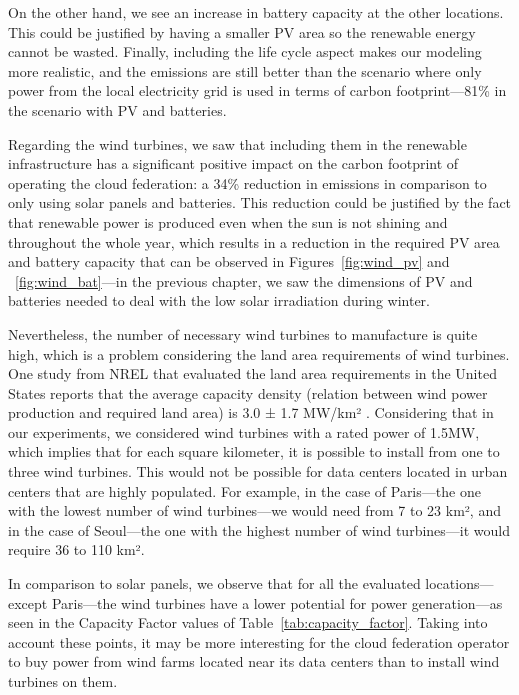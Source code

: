 On the other hand, we see an increase in battery capacity at the other locations. This could be justified by having a smaller PV area so the renewable energy cannot be wasted. Finally, including the life cycle aspect makes our modeling more realistic, and the emissions are still better than the scenario where only power from the local electricity grid is used in terms of carbon footprint---81\% in the scenario with PV and batteries.  


Regarding the wind turbines, we saw that including them in the renewable infrastructure has a significant positive impact on the carbon footprint of operating the cloud federation: a 34\% reduction in  emissions in comparison to only using solar panels and batteries. This reduction could be justified by the fact that renewable power is produced even when the sun is not shining and throughout the whole year, which results in a reduction in the required PV area and battery capacity that can be observed in Figures~\ref{fig:wind_pv} and ~\ref{fig:wind_bat}---in the previous chapter, we saw the dimensions of PV and batteries needed to deal with the low solar irradiation during winter.

Nevertheless, the number of necessary wind turbines to manufacture is quite high, which is a problem considering the land area requirements of wind turbines. One study from NREL that evaluated the land area requirements in the United States reports that the average capacity density (relation between wind power production and required land area) is 3.0 ± 1.7 MW/km² \cite{wtlanduse_2009}. Considering that in our experiments, we considered wind turbines with a rated power of 1.5MW, which implies that for each square kilometer, it is possible to install from one to three wind turbines. This would not be possible for data centers located in urban centers that are highly populated. For example, in the case of Paris---the one with the lowest number of wind turbines---we would need from 7 to 23 km², and in the case of Seoul---the one with the highest number of wind turbines---it would require 36 to 110 km². 

In comparison to solar panels, we observe that for all the evaluated locations---except Paris---the wind turbines have a lower potential for power generation---as seen in the Capacity Factor values of Table~\ref{tab:capacity_factor}. Taking into account these points, it may be more interesting for the cloud federation operator to buy power from wind farms located near its data centers than to install wind turbines on them.

